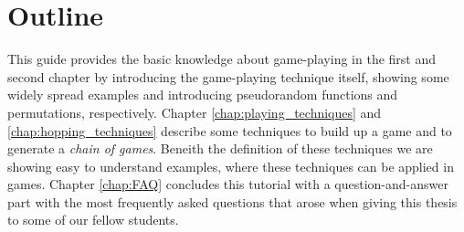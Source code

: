 \section*{Outline}
This guide provides the basic knowledge about game-playing in the first and second chapter by introducing the game-playing technique itself, showing some
widely spread examples and introducing pseudorandom functions and permutations, respectively.
Chapter \ref{chap:playing_techniques} and \ref{chap:hopping_techniques} describe some techniques to build up a game and to generate a \textit{chain of games}.
Beneith the definition of these techniques we are showing easy to understand examples, where these techniques can be applied in games.
Chapter \ref{chap:FAQ} concludes this tutorial with a question-and-answer part with the most frequently asked questions that arose when
giving this thesis to some of our fellow students.



